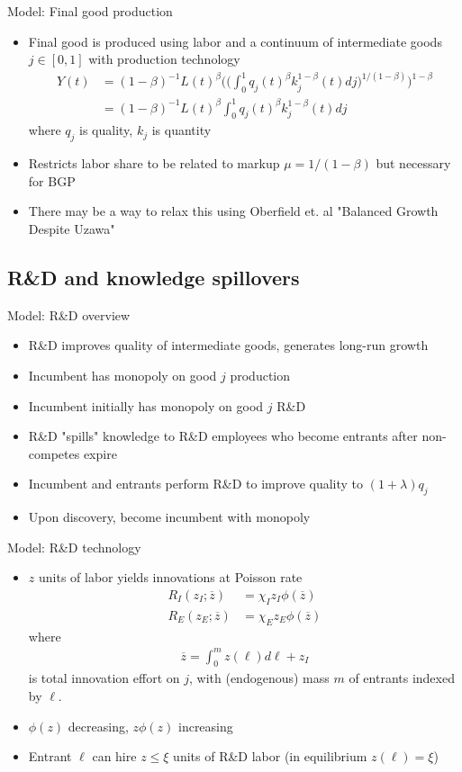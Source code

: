 \documentclass[english,usenames,dvipsnames]{beamer}
\begin{document}
\begin{frame}{Model: Final good production}
\begin{itemize}
	\item Final good is produced using labor and a continuum of intermediate goods $j\in[0,1]$ with production technology
	\begin{align*}
	Y(t) &= (1-\beta)^{-1} L(t)^{\beta}\Bigg(\Big(\int_0^1 q_j(t)^\beta 
	k_j^{1-\beta}(t)dj \Big)^{1/(1-\beta)}\Bigg)^{1-\beta} \\
		&= (1-\beta)^{-1} L(t)^{\beta}\int_0^1 q_j(t)^\beta k_j^{1-\beta}(t)dj
	\end{align*}
	where $q_j$ is quality, $k_j$ is quantity
	\item Restricts labor share to be related to markup $\mu = 1/(1-\beta)$ but necessary for BGP
	\item There may be a way to relax this using Oberfield et. al "Balanced Growth Despite Uzawa"
\end{itemize}
\end{frame}

\subsection{R\&D and knowledge spillovers}
\begin{frame}{Model: R\&D overview}
\begin{itemize}
	\item R\&D improves quality of intermediate goods, generates long-run growth
	\item Incumbent has monopoly on good $j$ production
	\item Incumbent initially has monopoly on good $j$ R\&D
	\item R\&D "spills" knowledge to R\&D employees who become entrants after non-competes expire 
	\item Incumbent and entrants perform R\&D to improve quality to $(1+\lambda) q_j$
	\item Upon discovery, become incumbent with monopoly
\end{itemize}
\end{frame}

\begin{frame}{Model: R\&D technology}
\begin{itemize}
	\item $z$ units of labor yields innovations at Poisson rate
	\begin{align*}
	R_I(z_I;\overline{z}) &= \chi_I z_I \phi(\overline{z}) \\
	R_E(z_E;\overline{z}) &= \chi_E z_E \phi(\overline{z}) 
	\end{align*}
	where 
	\begin{align*}
	\overline{z} = \int_0^m z(\ell)d\ell + z_I
	\end{align*}
	is total innovation effort on $j$, with (endogenous) mass $m$ of entrants indexed by $\ell$.
	\item $\phi(z)$ decreasing, $z\phi(z)$ increasing
	\item Entrant $\ell$ can hire $z\le\xi$ units of R\&D labor (in equilibrium $z(\ell) = \xi$)
\end{itemize}
\end{frame}
\end{document}
